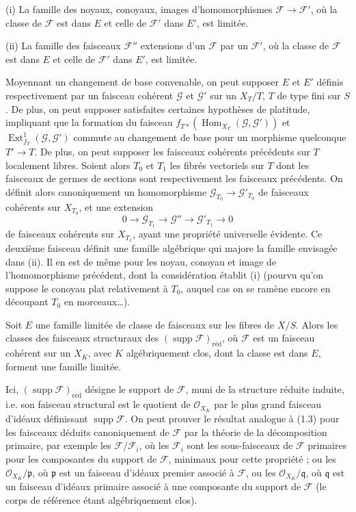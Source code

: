 \medskip
\noindent (i) La famille des noyaux, conoyaux, images d'homomorphismes
$\mathcal F\longrightarrow\mathcal F'$, où la classe de $\mathcal F$ est dans
$E$ et celle de $\mathcal F'$ dans $E'$, est limitée.

\smallskip
\noindent (ii) La famille des faisceaux $\mathcal F''$ extensions d'un
$\mathcal F$ par un $\mathcal F'$, où la classe de $\mathcal F$ est dans $E$
et celle de $\mathcal F'$ dans $E'$, est limitée.

Moyennant un changement de base convenable, on peut supposer $E$ et $E'$
définis respectivement par un faisceau cohérent $\mathcal G$ et $\mathcal G'$
sur un $X_T/T$, $T$ de type fini sur $S$. De plus, on peut supposer satisfaites
certaines hypothèses de platitude, impliquant que la formation du faisceau
$f_{T*}(\operatorname{Hom}_{X_T}(\mathcal G,\mathcal G'))$ et
$\operatorname{Ext}^{1}_{f_T}(\mathcal G,\mathcal G')$ commute au changement
de base pour un morphisme quelconque $T'\longrightarrow T$. De plus, on peut
supposer les faisceaux cohérents précédents sur $T$ localement libres. Soient
alors $T_0$ et $T_1$ les fibrés vectoriels sur $T$ dont les faisceaux de germes
de sections sont respectivement les faisceaux précédents. On définit alors
canoniquement un homomorphisme
$\mathcal G_{T_0}\longrightarrow\mathcal G'_{T_0}$ de faisceaux cohérents sur
$X_{T_0}$, et une extension
\[
0\longrightarrow\mathcal G_{T_1}\longrightarrow\mathcal G''
\longrightarrow\mathcal G'_{T_1}\longrightarrow0
\]
de faisceaux cohérents sur $X_{T_1}$, ayant une propriété universelle évidente.
Ce deuxième faisceau définit une famille algébrique qui majore la famille
envisagée dans (ii). Il en est de même pour les noyau, conoyau et image de
l'homomorphisme
précédent, dont la considération établit (i) (pourvu qu'on suppose le conoyau
plat relativement à $T_0$, auquel cas on se ramène encore en découpant $T_0$ en
morceaux\ldots).

 Soit $E$ une famille limitée de classe de faisceaux
sur les fibres de $X/S$. Alors les classes des faisceaux structuraux des
$(\operatorname{supp}\mathcal F)_{\mathrm{réd}}$, où $\mathcal F$ est un
faisceau cohérent sur un $X_K$, avec $K$ algébriquement clos, dont la classe est
dans $E$, forment une famille limitée.

Ici, $(\operatorname{supp}\mathcal F)_{\mathrm{réd}}$ désigne le support de
$\mathcal F$, muni de la structure réduite induite, i.e. son faisceau
structural est le quotient de $\mathcal O_{X_K}$ par le plus grand faisceau
d'idéaux définissant $\operatorname{supp}\mathcal F$. On peut prouver le
résultat analogue à (1.3) pour les faisceaux déduits canoniquement de
$\mathcal F$ par la théorie de la décomposition primaire, par exemple les
$\mathcal F/\mathcal F_i$, où les $\mathcal F_i$ sont les sous-faisceaux de
$\mathcal F$ primaires pour les composantes du support de $\mathcal F$,
minimaux pour cette propriété ; ou les $\mathcal O_{X_K}/\mathfrak p$, où
$\mathfrak p$ est un faisceau d'idéaux premier associé à $\mathcal F$, ou les
$\mathcal O_{X_K}/\mathfrak q$, où $\mathfrak q$ est un faisceau d'idéaux
primaire associé à une composante du support de $\mathcal F$ (le corps de
référence étant algébriquement clos).

